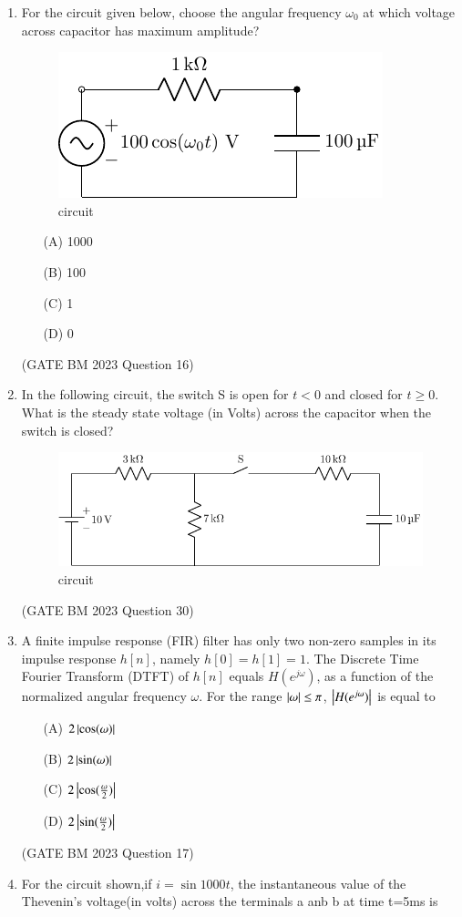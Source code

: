 \begin{enumerate}[label=\thechapter.\arabic*,ref=\thechapter.\theenumi]
\item
For the circuit given below, choose the angular frequency $ \omega_0$ at which voltage across capacitor has maximum amplitude?
\begin{figure}[h!]
    \includegraphics[width = 0.5\columnwidth]{2023/BM/16/figs/c_fig1.pdf}
    \caption{circuit }
    \centering
    \label{fig: bm_16_fig_1}
\end{figure}
\begin{enumerate}
    \item[(A)] 1000
    \item[(B)] 100
    \item[(C)] 1
    \item[(D)] 0   
\end{enumerate}
\hfill(GATE BM 2023 Question 16)\\
\item
In the following circuit, the switch S is open for $t < 0$ and closed for $t \ge 0$.
What is the steady state voltage (in Volts) across the capacitor when the switch is closed?
\begin{figure}[h!]
    \includegraphics[width = 0.7\columnwidth]{2023/BM/30/figs/c_fig1.pdf}
    \caption{circuit }
    \centering
    \label{fig:bm_30_fig_1}
\end{figure}
\hfill(GATE BM 2023 Question 30)\\
\item 
A finite impulse response (FIR) filter has only two non-zero samples in its impulse response $h[n]$, namely $h[0] = h[1] = 1$. The Discrete Time Fourier Transform (DTFT) of $h[n]$ equals $H(e^{j\omega})$, as a function of the normalized angular frequency $\omega$. For the range $\left\vert\omega\right\vert \leq \pi$, $\left\vert H(e^{j\omega})\right\vert$ is equal to
\begin{enumerate}
	\item[(A)] $2\left\vert\cos(\omega)\right\vert$
	\item[(B)] $2\left\vert\sin(\omega)\right\vert$
	\item[(C)] $2\left\vert\cos(\frac{\omega}{2})\right\vert$
	\item[(D)] $2\left\vert\sin(\frac{\omega}{2})\right\vert$
\end{enumerate}
\hfill(GATE BM 2023 Question 17) \\
\item
For the circuit shown,if $i=\sin 1000t$, the instantaneous value of the Thevenin's voltage(in volts) across the terminals a anb b at time t=5ms is\\[2pt]


\end{enumerate}

